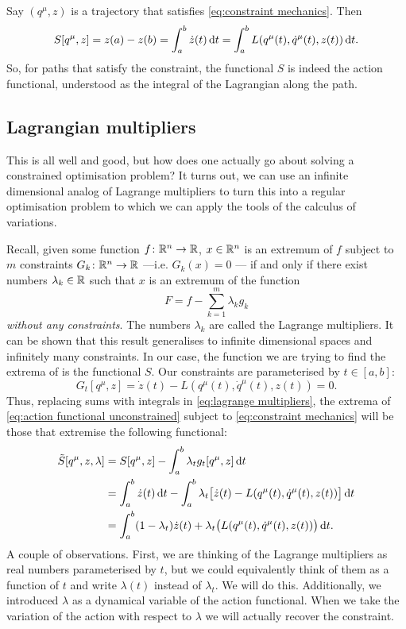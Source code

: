 \documentclass[../main.tex]{subfiles}
\begin{document}
Say \( (q^\mu, z) \) is a trajectory that satisfies \cref{eq:constraint mechanics}. Then 
\begin{equation*}
	S[q^\mu, z] = z(a) - z(b) = \int_a^b \dot{z}(t) \,\mathrm{d} t = \int_a^b L(q^\mu(t),
	\dot{q}^\mu(t), z(t)) \,\mathrm{d} t. 
\end{equation*}
So, for paths that satisfy the constraint, the functional \( S \) is indeed the
action functional, understood as the integral of the Lagrangian along the path.

\subsection{Lagrangian multipliers}
This is all well and good, but how does one actually go about solving a constrained
optimisation problem? It turns out, we can use an infinite dimensional analog of Lagrange
multipliers to turn this into a regular optimisation problem to which we can apply the
tools of the calculus of variations. 

Recall, given some function \( f \colon \mathbb{R}^n \to \mathbb{R} \), \( x \in \mathbb{R}^n \) is an extremum of
\( f \) subject to \( m \) constraints \( G_k \colon \mathbb{R}^n \to \mathbb{R} \) ---i.e. \( G_k(x) = 0
\) --- if and only if there exist numbers \( \lambda_k \in \mathbb{R} \) such that
\( x \) is an extremum of the function
\begin{equation} \label{eq:lagrange multipliers}
	 F = f - \sum_{k = 1}^{m}\lambda_k g_k 
\end{equation}
\emph{without any constraints}. The numbers \( \lambda_k \) are called the Lagrange
multipliers. It can be shown that this result generalises to infinite dimensional spaces
and infinitely many constraints. In our case, the function we are trying to find the
extrema of is the functional \( S \). Our constraints are parameterised by \( t \in [a,b]
\):
\begin{equation*}
	G_t[q^\mu, z] = \dot{z}(t) - L(q^\mu(t), \dot{q}^\mu(t), z(t)) = 0.
\end{equation*}
Thus, replacing sums with integrals in \cref{eq:lagrange multipliers}, the extrema of
\cref{eq:action functional unconstrained} subject to \cref{eq:constraint mechanics} will
be those that extremise the following functional: 
\begin{align} \label{eq:lagrange multiplier action}
	\tilde{S}[q^\mu, z, \lambda] & = S[q^\mu, z] - \int_a^b \lambda_t g_t[q^\mu, z] \,\mathrm{d} t
	\nonumber \\
															 & = \int_a^b \dot{z}(t) \,\mathrm{d} t - \int_a^b \lambda_t\big[\dot{z}(t) -
		L(q^\mu(t), \dot{q}^\mu(t), z(t))\big] \,\mathrm{d} t \nonumber \\ & = \int_a^b (1 - \lambda_t)
		\dot{z}(t) + \lambda_t\big(L(q^\mu(t), \dot{q}^\mu(t), z(t))\big) \,\mathrm{d} t.
\end{align}
A couple of observations. First, we are thinking of the Lagrange multipliers as real
numbers parameterised by \( t \), but we could equivalently think of them as a function of
\( t \) and write \( \lambda(t) \) instead of \( \lambda_t \). We will do this.
Additionally, we introduced \( \lambda \) as a dynamical variable of the action
functional. When we take the variation of the action with respect to \( \lambda \) we will
actually recover the constraint. 
\end{document}

